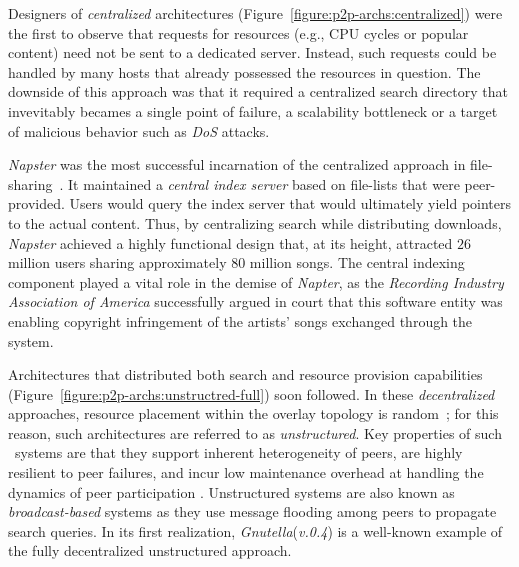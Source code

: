 Designers of \emph{centralized} architectures 
(Figure~\ref{figure:p2p-archs:centralized}) were the first 
to observe that requests for resources
(e.g., CPU cycles or popular content) need not be sent to
a dedicated server. Instead, such requests could be handled by 
many hosts that already possessed the resources in question. 
The downside of this approach was that it required a 
centralized search directory that invevitably becames a single point of failure,
a scalability bottleneck or a target of malicious behavior such as \emph{DoS}
attacks.

{\sl Napster} was the most successful incarnation of the
centralized approach in file-sharing~\cite{napster}.
It maintained a \emph{central index server} based on file-lists 
that were peer-provided.
Users would query the index server that would ultimately 
yield pointers to the actual content.
Thus, by centralizing search while distributing downloads,  {\sl Napster}
achieved a highly functional design that, at its height, attracted $26$ million
users sharing approximately $80$ million songs\cite{jmm_naptopusage_2001}.
The central indexing component played a vital role in the demise of 
{\sl Napter}, as the \emph{Recording
Industry Association of America} successfully argued in court that this software
entity was enabling copyright infringement of the artists' songs exchanged
through the system.

Architectures that distributed both search and resource provision 
capabilities (Figure~\ref{figure:p2p-archs:unstructred-full}) soon followed.
In these \emph{decentralized} approaches, 
resource placement within the overlay topology is random~\cite{YG-M2002};
for this reason, such architectures are referred to as \emph{unstructured}. 
Key properties of such \p\ systems are that they support inherent heterogeneity
of peers, are highly resilient to peer failures, and incur low maintenance
overhead at handling the dynamics of peer participation
\cite{stutzbach_churn_2006}. Unstructured systems are also known as 
\emph{broadcast-based} systems as they use message flooding among
peers to propagate search queries. 
In its first realization,
{\sl Gnutella}(\emph{v.0.4}) is a well-known example of the fully
decentralized unstructured approach.


